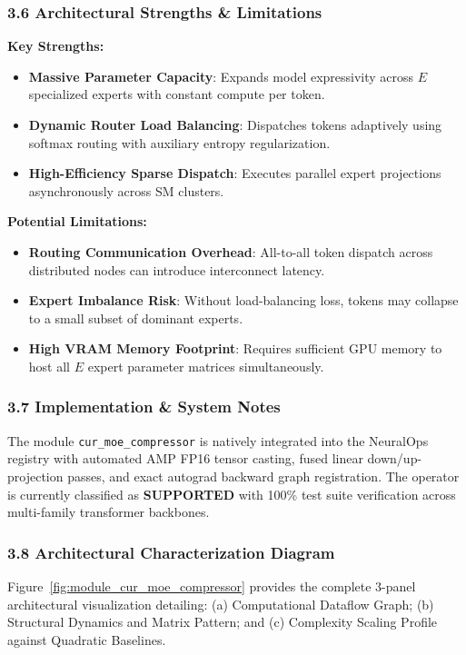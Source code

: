 \subsubsection*{3.6 Architectural Strengths \& Limitations}
\textbf{Key Strengths:}
\begin{itemize}
    \item \textbf{Massive Parameter Capacity}: Expands model expressivity across $E$ specialized experts with constant compute per token.
    \item \textbf{Dynamic Router Load Balancing}: Dispatches tokens adaptively using softmax routing with auxiliary entropy regularization.
    \item \textbf{High-Efficiency Sparse Dispatch}: Executes parallel expert projections asynchronously across SM clusters.
\end{itemize}

\textbf{Potential Limitations:}
\begin{itemize}
    \item \textbf{Routing Communication Overhead}: All-to-all token dispatch across distributed nodes can introduce interconnect latency.
    \item \textbf{Expert Imbalance Risk}: Without load-balancing loss, tokens may collapse to a small subset of dominant experts.
    \item \textbf{High VRAM Memory Footprint}: Requires sufficient GPU memory to host all $E$ expert parameter matrices simultaneously.
\end{itemize}

\subsubsection*{3.7 Implementation \& System Notes}
The module \texttt{cur\_moe\_compressor} is natively integrated into the NeuralOps registry with automated AMP FP16 tensor casting, fused linear down/up-projection passes, and exact autograd backward graph registration. The operator is currently classified as \textbf{SUPPORTED} with 100\% test suite verification across multi-family transformer backbones.

\subsubsection*{3.8 Architectural Characterization Diagram}
Figure~\ref{fig:module_cur_moe_compressor} provides the complete 3-panel architectural visualization detailing: (a) Computational Dataflow Graph; (b) Structural Dynamics and Matrix Pattern; and (c) Complexity Scaling Profile against Quadratic Baselines.

